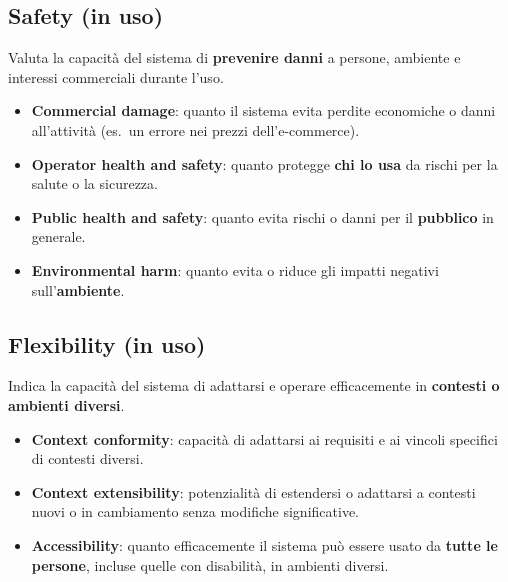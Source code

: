 
\subsection{Safety (in uso)}

Valuta la capacità del sistema di \textbf{prevenire danni} a persone, ambiente e interessi commerciali durante l'uso.
\begin{itemize}
  \item \textbf{Commercial damage}: quanto il sistema evita perdite economiche o danni all'attività (es.\ un errore nei prezzi dell'e-commerce).
  \item \textbf{Operator health and safety}: quanto protegge \textbf{chi lo usa} da rischi per la salute o la sicurezza.
  \item \textbf{Public health and safety}: quanto evita rischi o danni per il \textbf{pubblico} in generale.
  \item \textbf{Environmental harm}: quanto evita o riduce gli impatti negativi sull'\textbf{ambiente}.
\end{itemize}

\subsection{Flexibility (in uso)}

Indica la capacità del sistema di adattarsi e operare efficacemente in \textbf{contesti o ambienti diversi}.
\begin{itemize}
  \item \textbf{Context conformity}: capacità di adattarsi ai requisiti e ai vincoli specifici di contesti diversi.
  \item \textbf{Context extensibility}: potenzialità di estendersi o adattarsi a contesti nuovi o in cambiamento senza modifiche significative.
  \item \textbf{Accessibility}: quanto efficacemente il sistema può essere usato da \textbf{tutte le persone}, incluse quelle con disabilità, in ambienti diversi.
\end{itemize}

